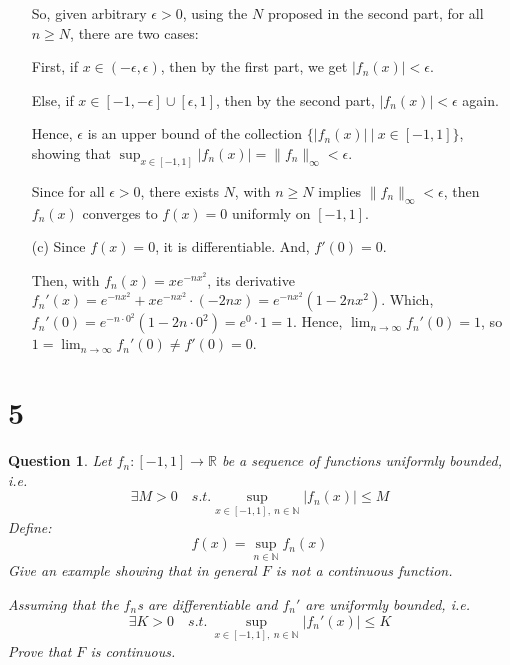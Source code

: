 \documentclass{article}
\newtheorem{question}{Question}
\begin{document}
\begin{itemize}
    \hfill

    So, given arbitrary $\epsilon>0$, using the $N$ proposed in the second part, for all $n\geq N$, there are two cases:

    First, if $x\in (-\epsilon,\epsilon)$, then by the first part, we get $|f_n(x)|<\epsilon$.

    Else, if $x\in [-1,-\epsilon]\cup[\epsilon,1]$, then by the second part, $|f_n(x)|<\epsilon$ again.

    Hence, $\epsilon$ is an upper bound of the collection $\{|f_n(x)|\ |\ x\in [-1,1]\}$, showing that $\sup_{x\in[-1,1]}|f_n(x)|=\|f_n\|_\infty<\epsilon$.

    Since for all $\epsilon>0$, there exists $N$, with $n\geq N$ implies $\|f_n\|_\infty<\epsilon$, then $f_n(x)$ converges to $f(x)=0$ uniformly on $[-1,1]$.
    
    \hfill

    \item[(c)] Since $f(x)=0$, it is differentiable. And, $f'(0)=0$.
    
    Then, with $f_n(x)=xe^{-nx^2}$, its derivative $f_n'(x)=e^{-nx^2}+xe^{-nx^2}\cdot(-2nx) = e^{-nx^2}(1-2nx^2)$.
    Which, $f_n'(0) = e^{-n\cdot 0^2}(1-2n\cdot 0^2) = e^0\cdot 1 = 1$. Hence, $\lim_{n\rightarrow\infty}f_n'(0)=1$, 
    so $1 = \lim_{n\rightarrow\infty}f_n'(0) \neq f'(0) = 0$.
\end{itemize}

\hfill

\hfill

\section*{5}
\begin{myBox}[]{}
    \begin{question}
        Let $f_n:[-1,1]\rightarrow\mathbb{R}$ be a sequence of functions uniformly bounded, i.e.
        $$\exists M>0\quad s.t. \sup_{x\in [-1,1],\ n\in\mathbb{N}}|f_n(x)| \leq M$$
        Define:
        $$f(x)=\sup_{n\in\mathbb{N}}f_n(x)$$
        Give an example showing that in general $F$ is not a continuous function. 
        
        Assuming that the $f_n$s are differentiable and $f_n'$ are uniformly bounded, i.e.
        $$\exists K>0\quad s.t.\ \sup_{x\in[-1,1],\ n\in\mathbb{N}}|f_n'(x)|\leq K$$
        Prove that $F$ is continuous.
    \end{question}
\end{myBox}
\end{document}
